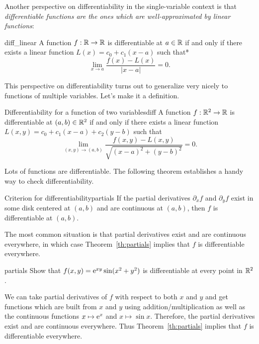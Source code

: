 \documentclass{watsonbook}
\begin{document}
  Another perspective on differentiability in the single-variable
  context is that \textit{differentiable functions are the ones which
    are well-approximated by linear functions}:

  \begin{theo}{}{diff_linear}
    A function $f: \mathbb{R} \to \mathbb{R}$ is differentiable at $a \in \mathbb{R}$ if and
    only if there exists a linear function $L(x) = c_0 + c_1(x-a) $
    such that* 
    \[
      \lim_{x \to a}\frac{f(x) - L(x)}{|x-a|} = 0. 
    \]
  \end{theo}

  This perspective on differentiability turns out to generalize very
  nicely to functions of multiple variables. Let's make it a
  definition.

  \begin{defn}{Differentiability for a function of two variables}{diff}
    A function $f: \mathbb{R}^2 \to \mathbb{R}$ is differentiable at $(a,b) \in \mathbb{R}^2$
    if and only if there exists a linear function
    $L(x,y) = c_0 + c_{1}(x-a) + c_{2}(y-b)$ such that
    \[
      \lim_{(x,y) \to (a,b)}\frac{f(x,y) - L(x,y)}{\sqrt{(x-a)^2 + (y-b)^2}} = 0. 
    \]
  \end{defn}

  Lots of functions are differentiable. The following theorem
  establishes a handy way to check differentiability. 

  \begin{theo}{Criterion for differentiability}{partials} 
    If the partial derivatives $\partial_x f$ and $\partial_y f$ exist
    in some disk centered at $(a,b)$ and are continuous at $(a,b)$, then
    $f$ is differentiable at $(a,b)$. 
  \end{theo}

  The most common situation is that partial derivatives exist and are
  continuous everywhere, in which case Theorem~\ref{th:partials}
  implies that $f$ is differentiable everywhere.

  \begin{example}{}{partials}
    Show that $f(x,y) = \operatorname{e}^{xy} \sin (x^2 + y^2)$ is differentiable at
    every point in $\mathbb{R}^2$. 
  \end{example}

  \begin{solution}
    We can take partial derivatives of $f$ with respect to both $x$
    and $y$ and get functions which are built from $x$ and $y$ using
    addition/multiplication as well as the continuous functions
    $x\mapsto \operatorname{e}^x$ and $x\mapsto \sin x$. Therefore, the partial
    derivatives exist and are continuous everywhere. Thus
    Theorem~\ref{th:partials} implies that $f$ is differentiable
    everywhere. 
  \end{solution}
\end{document}

